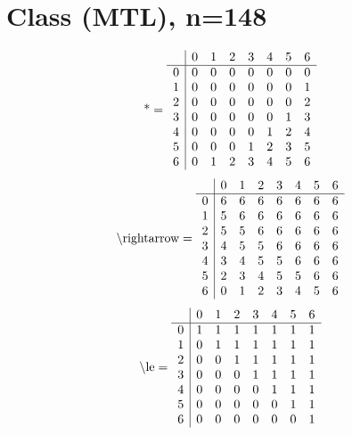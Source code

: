\documentclass[11pt]{article}
\begin{document}
\section{Class (MTL), n=148}
\[\text{*} = 
\begin{array}{r | r r r r r r r}
 & 0 & 1 & 2 & 3 & 4 & 5 & 6 \\ \hline
0 & 0 & 0 & 0 & 0 & 0 & 0 & 0 \\
1 & 0 & 0 & 0 & 0 & 0 & 0 & 1 \\
2 & 0 & 0 & 0 & 0 & 0 & 0 & 2 \\
3 & 0 & 0 & 0 & 0 & 0 & 1 & 3 \\
4 & 0 & 0 & 0 & 0 & 1 & 2 & 4 \\
5 & 0 & 0 & 0 & 1 & 2 & 3 & 5 \\
6 & 0 & 1 & 2 & 3 & 4 & 5 & 6 \\
\end{array}
\]
\[\text{\textbackslash rightarrow} = 
\begin{array}{r | r r r r r r r}
 & 0 & 1 & 2 & 3 & 4 & 5 & 6 \\ \hline
0 & 6 & 6 & 6 & 6 & 6 & 6 & 6 \\
1 & 5 & 6 & 6 & 6 & 6 & 6 & 6 \\
2 & 5 & 5 & 6 & 6 & 6 & 6 & 6 \\
3 & 4 & 5 & 5 & 6 & 6 & 6 & 6 \\
4 & 3 & 4 & 5 & 5 & 6 & 6 & 6 \\
5 & 2 & 3 & 4 & 5 & 5 & 6 & 6 \\
6 & 0 & 1 & 2 & 3 & 4 & 5 & 6 \\
\end{array}
\]
\[\text{\textbackslash le} = 
\begin{array}{r | r r r r r r r}
 & 0 & 1 & 2 & 3 & 4 & 5 & 6 \\ \hline
0 & 1 & 1 & 1 & 1 & 1 & 1 & 1 \\
1 & 0 & 1 & 1 & 1 & 1 & 1 & 1 \\
2 & 0 & 0 & 1 & 1 & 1 & 1 & 1 \\
3 & 0 & 0 & 0 & 1 & 1 & 1 & 1 \\
4 & 0 & 0 & 0 & 0 & 1 & 1 & 1 \\
5 & 0 & 0 & 0 & 0 & 0 & 1 & 1 \\
6 & 0 & 0 & 0 & 0 & 0 & 0 & 1 \\
\end{array}
\]
\end{document}
